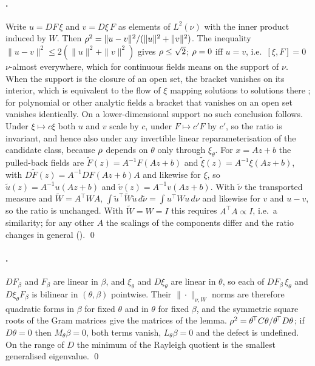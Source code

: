 \paragraph{.} Write $u = DF\,\xi$ and $v = D\xi\,F$ as elements
of $L^2(\nu)$ with the inner product induced by $W$. Then $\rho^2 =
\|u-v\|^2/(\|u\|^2+\|v\|^2)$. The inequality $\|u-v\|^2 \le
2(\|u\|^2+\|v\|^2)$ gives $\rho \le \sqrt 2$; $\rho = 0$ iff $u = v$,
i.e.\ $[\xi,F]=0$ $\nu$-almost everywhere, which for continuous fields means on
the support of $\nu$. When the support is the closure of an open set, the
bracket vanishes on its interior, which is equivalent to the flow of $\xi$
mapping solutions to solutions there \citep[Ch.~9]{lee2013smooth}; for
polynomial or other analytic fields a bracket that vanishes on an open set
vanishes identically. On a lower-dimensional support no such conclusion
follows. Under
$\xi \mapsto c\xi$ both $u$ and $v$ scale by $c$, under $F \mapsto c'F$ by
$c'$, so the ratio is invariant, and hence also under any invertible linear
reparameterisation of the candidate class, because $\rho$ depends on
$\theta$ only through $\xi_\theta$. For $x = Az+b$ the pulled-back fields are
$\tilde F(z) = A^{-1}F(Az+b)$ and $\tilde\xi(z) = A^{-1}\xi(Az+b)$, with
$D\tilde F(z) = A^{-1}DF(Az+b)A$ and likewise for $\xi$, so $\tilde u(z) =
A^{-1}u(Az+b)$ and $\tilde v(z) = A^{-1}v(Az+b)$. With $\tilde\nu$ the
transported measure and $\tilde W = A^{\!\top}WA$, $\int \tilde u^{\!\top}\tilde
W\tilde u\,d\tilde\nu = \int u^{\!\top}Wu\,d\nu$ and likewise for $v$ and $u-v$,
so the ratio is unchanged. With $\tilde W = W = I$ this requires
$A^{\!\top}A \propto I$, i.e.\ a similarity; for any other $A$ the scalings of
the components differ and the ratio changes in general (\STunits). \qed

\paragraph{.} $DF_\beta$ and $F_\beta$ are linear in $\beta$,
and $\xi_\theta$ and $D\xi_\theta$ are linear in $\theta$, so each of
$DF_\beta\,\xi_\theta$ and $D\xi_\theta F_\beta$ is bilinear in $(\theta,\beta)$
pointwise. Their $\|\cdot\|_{\nu,W}$ norms are therefore quadratic forms in
$\beta$ for fixed $\theta$ and in $\theta$ for fixed $\beta$, and the symmetric
square roots of the Gram matrices give the matrices of the lemma.
$\rho^2 = \theta^{\!\top}C\theta / \theta^{\!\top}D\theta$; if $D\theta = 0$
then $M_\theta\beta = 0$, both terms vanish, $L_\theta\beta = 0$ and the defect
is undefined. On the range of $D$ the minimum of the Rayleigh quotient is the
smallest generalised eigenvalue. \qed

